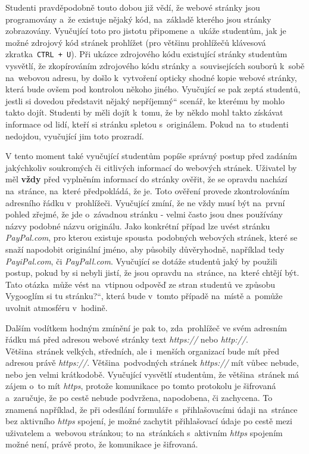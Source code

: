 \documentclass[a4paper, 12pt]{article}
\providecommand{\uv}[1]{\quotedblbase #1\textquotedblleft}
\begin{document}
Studenti pravděpodobně touto dobou již vědí, že webové stránky jsou programovány a~že existuje nějaký kód, na~základě kterého jsou stránky zobrazovány. Vyučující toto pro jistotu připomene a~ukáže studentům, jak je možné zdrojový kód stránek prohlížet (pro většinu prohlížečů klávesová zkratka~\texttt{CTRL + U}). Při ukázce zdrojového kódu existující stránky studentům vysvětlí, že zkopírováním zdrojového kódu stránky a~souvisejících souborů k~sobě na~webovou adresu, by došlo k~vytvoření opticky shodné kopie webové stránky, která bude ovšem pod kontrolou někoho jiného. Vyučující se pak zeptá studentů, jestli si dovedou představit nějaký \uv{nepříjemný} scenář, ke kterému by mohlo takto dojít. Studenti by měli dojít k~tomu, že by někdo mohl takto získávat informace od lidí, kteří si stránku spletou s~originálem. Pokud na~to studenti nedojdou, vyučující jim toto prozradí.

V tento moment také vyučující studentům popíše správný postup před zadáním jakýchkoliv soukromých či citlivých informací do webových stránek. Uživatel by měl \textbf{vždy} před vyplněním informací do stránky ověřit, že se opravdu nachází na~stránce, na~které předpokládá, že je. Toto ověření provede zkontrolováním adresního řádku v~prohlížeči. Vyučující zmíní, že ne vždy musí být na~první pohled zřejmé, že jde o~závadnou stránku - velmi často jsou dnes používány názvy podobné názvu originálu. Jako konkrétní případ lze uvést stránku \textit{PayPal.com}, pro kterou existuje spousta~podobných webových stránek, které se snaží napodobit originální jméno, aby působily důvěryhodně, například tedy \textit{PayiPal.com}, či \textit{PayPall.com}. Vyučující se dotáže studentů jaký by použili postup, pokud by si nebyli jistí, že jsou opravdu na~stránce, na~které chtějí být. Tato otázka~může vést na~vtipnou odpověď ze stran studentů ve způsobu \uv{Vygooglím si tu stránku?}, která bude v~tomto případě na~místě a~pomůže uvolnit atmosféru v~hodině.

Dalším vodítkem hodným zmínění je pak to, zda~prohlížeč ve svém adresním řádku má před adresou webové stránky text \textit{https://} nebo \textit{http://}. Většina~stránek velkých, středních, ale i~menších organizací bude mít před adresou právě \textit{https://}. Většina~podvodných stránek \textit{https://} mít vůbec nebude, nebo jen velmi krátkodobě. Vyučující vysvětlí studentům, že většina~stránek má zájem o~to mít \textit{https}, protože komunikace po tomto protokolu je šifrovaná a~zaručuje, že po cestě nebude podvržena, napodobena, či zachycena. To znamená například, že při odesílání formuláře s~přihlašovacími údaji na~stránce bez aktivního \textit{https} spojení, je možné zachytit přihlašovací údaje po cestě mezi uživatelem a~webovou stránkou; to na~stránkách s~aktivním \textit{https} spojením možné není, právě proto, že komunikace je šifrovaná.
\end{document}
